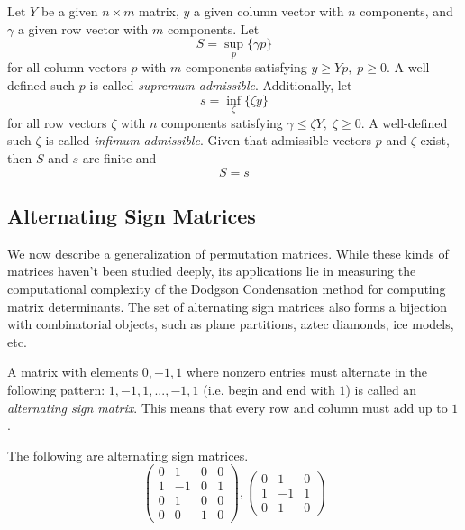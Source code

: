 \documentclass{article}
\begin{document}
    \begin{theorem}
    Let $Y$ be a given $n \times m$ matrix, $y$ a given column vector with $n$ components, and $\gamma$ a given row vector with $m$ components. Let 
    \[S = \sup_p \{\gamma p\}\]
    for all column vectors $p$ with $m$ components satisfying $y \geq Y p, \; p \geq 0$. A well-defined such $p$ is called \textit{supremum admissible}. Additionally, let 
    \[s = \inf_\zeta \{ \zeta y\}\]
    for all row vectors $\zeta$ with $n$ components satisfying $\gamma \leq \zeta Y, \; \zeta \geq 0$. A well-defined such $\zeta$ is called \textit{infimum admissible}. Given that admissible vectors $p$ and $\zeta$ exist, then $S$ and $s$ are finite and 
    \[S = s\]
    \end{theorem}

  \subsection{Alternating Sign Matrices}

    We now describe a generalization of permutation matrices. While these kinds of matrices haven't been studied deeply, its applications lie in measuring the computational complexity of the Dodgson Condensation method for computing matrix determinants. The set of alternating sign matrices also forms a bijection with combinatorial objects, such as plane partitions, aztec diamonds, ice models, etc. 

    \begin{definition}
    A matrix with elements $0, -1, 1$ where nonzero entries must alternate in the following pattern: $1, -1, 1, ..., -1, 1$ (i.e. begin and end with $1$) is called an \textit{alternating sign matrix}. This means that every row and column must add up to $1$. 
    \end{definition}

    \begin{example}
    The following are alternating sign matrices. 
    \[\begin{pmatrix}
    0&1&0&0\\1&-1&0&1\\0&1&0&0\\0&0&1&0
    \end{pmatrix}, \begin{pmatrix}
    0&1&0\\1&-1&1\\0&1&0
    \end{pmatrix}\]
    \end{example}
\end{document}
